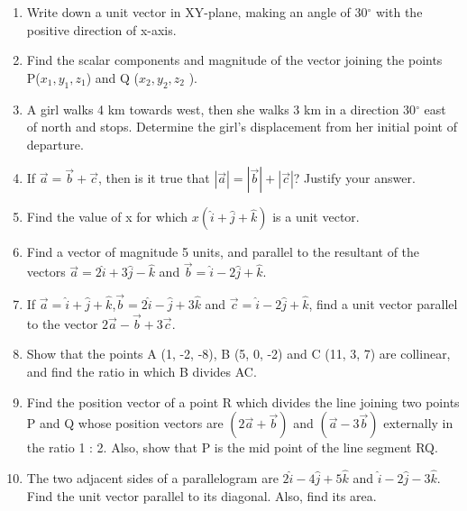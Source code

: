 \begin{enumerate}[label=\thesection.\arabic*,ref=\thesection.\theenumi]
\item Write down a unit vector in XY-plane, making an angle of 30$^{\circ}$ with the positive direction of x-axis.\\
\item Find the scalar components and magnitude of the vector joining the points P($x_1,y_1,z_1 $) and Q ($x_2,y_2,z_2$ ).\\
\item A girl walks 4 km towards west, then she walks 3 km in a direction 30$^{\circ}$ east of north and stops. Determine the girl's displacement from her initial point of departure.\\
	\solution
		
\item If $\vec{a}=\vec{b}+\vec{c}$, then is it true that $|\vec{a}|=|\vec{b}|+|\vec{c}|$? Justify your answer.\\
	\solution
		
\item Find the value of x for which $x(\hat{i}+\hat{j}+\hat{k})$ is a unit vector.\\
	\solution
		
\item Find a vector of magnitude 5 units, and parallel to the resultant of the vectors $\vec{a}=2\hat{i}+3\hat{j}-\hat{k}$ and $\vec{b}=\hat{i}-2\hat{j}+\hat{k}$.\\
\item If $\vec{a}=\hat{i}+\hat{j}+\hat{k}$,$\vec{b}=2\hat{i}-\hat{j}+3\hat{k}$ and $\vec{c}=\hat{i}-2\hat{j}+\hat{k}$, find a unit vector parallel to the vector $2\vec{a}-\vec{b}+3\vec{c}$.\\
	\solution
		
\item Show that the points A (1, -2, -8), B (5, 0, -2) and C (11, 3, 7) are collinear, and find the ratio in which B divides AC.\\
\item Find the position vector of a point R which divides the line joining two points P and Q whose position vectors are $(2\vec{a}+\vec{b})$ and $(\vec{a}-3\vec{b})$
externally in the ratio 1 : 2. Also, show that P is the mid point of the line segment RQ.\\
\item The two adjacent sides of a parallelogram are 
$2\hat{i}-4\hat{j}+5\hat{k}$  and  $\hat{i}-2\hat{j}-3\hat{k}$.
Find the unit vector parallel to its diagonal. Also, find its area.\\

\end{enumerate}
